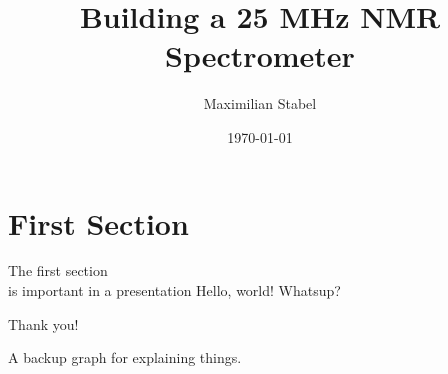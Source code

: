 \documentclass{beamer}
\title{Building a 25 MHz NMR Spectrometer}
\date{\today}
\author{Maximilian Stabel}
\institute{ETH Zürich}
\begin{document}
  \maketitle
  \section{First Section}
  \begin{frame}{The first section\\is important in a presentation}
    Hello, world! Whatsup?
  \end{frame}
  \begin{frame}[standout]
    Thank you!
  \end{frame}
  \appendix
  \begin{frame}[standout]
    A backup graph for explaining things.
  \end{frame}
\end{document}
